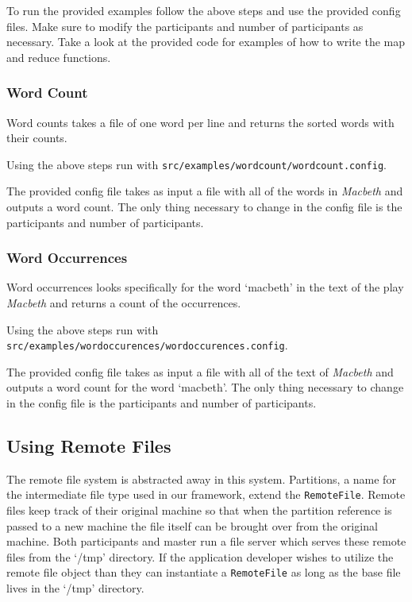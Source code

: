 \documentclass[12pt]{article}
\newcommand{\ttt}{\texttt}
\begin{document}
To run the provided examples follow the above steps and use the provided config files. Make sure to modify the participants and number of participants as necessary. Take a look at the provided code for examples of how to write the map and reduce functions.

\subsubsection{Word Count}
Word counts takes a file of one word per line and returns the sorted words with their counts. 

Using the above steps run with \ttt{src/examples/wordcount/wordcount.config}.

The provided config file takes as input a file with all of the words in \textit{Macbeth} and outputs a word count. The only thing necessary to change in the config file is the participants and number of participants.

\subsubsection{Word Occurrences}
Word occurrences looks specifically for the word `macbeth' in the text of the play \textit{Macbeth} and returns a count of the occurrences.

Using the above steps run with \ttt{src/examples/wordoccurences/wordoccurences.config}.

The provided config file takes as input a file with all of the text of \textit{Macbeth} and outputs a word count for the word `macbeth'. The only thing necessary to change in the config file is the participants and number of participants.

\subsection{Using Remote Files}

The remote file system is abstracted away in this system. Partitions, a name for the intermediate file type used in our framework, extend the \ttt{RemoteFile}. Remote files keep track of their original machine so that when the partition reference is passed to a new machine the file itself can be brought over from the original machine. Both participants and master run a file server which serves these remote files from the `/tmp' directory. If the application developer wishes to utilize the remote file object than they can instantiate a \ttt{RemoteFile} as long as the base file lives in the `/tmp' directory.
\end{document}
